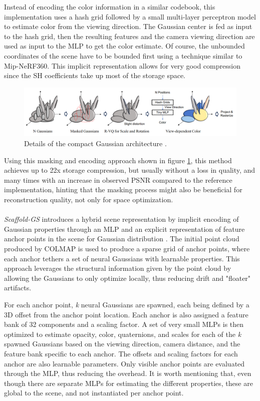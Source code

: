 Instead of encoding the color information in a similar codebook, this implementation uses a hash grid followed by a small multi-layer perceptron model to estimate color from the viewing direction. The Gaussian center is fed as input to the hash grid, then the resulting features and the camera viewing direction are used as input to the MLP to get the color estimate. Of course, the unbounded coordinates of the scene have to be bounded first using a technique similar to Mip-NeRF360. This implicit representation allows for very good compression since the SH coefficients take up most of the storage space.

\begin{figure}[H]
    \centering
    \includegraphics[width=0.7\linewidth]{figures/compact_arch.png}
    \caption{Details of the compact Gaussian architecture \cite{Lee_2024_CVPR}.}
    \label{fig:compact_arch}
\end{figure}

Using this masking and encoding approach shown in figure \ref{fig:compact_arch}, this method achieves up to 22x storage compression, but usually without a loss in quality, and many times with an increase in observed PSNR compared to the reference implementation, hinting that the masking process might also be beneficial for reconstruction quality, not only for space optimization.

\paragraph{}
\textit{Scaffold-GS} introduces a hybrid scene representation by implicit encoding of Gaussian properties through an MLP and an explicit representation of feature anchor points in the scene for Gaussian distribution \cite{scaffoldgs}. The initial point cloud produced by COLMAP is used to produce a sparse grid of anchor points, where each anchor tethers a set of neural Gaussians with learnable properties. This approach leverages the structural information given by the point cloud by allowing the Gaussians to only optimize locally, thus reducing drift and "floater" artifacts. 

For each anchor point, \textit{k} neural Gaussians are spawned, each being defined by a 3D offset from the anchor point location. Each anchor is also assigned a feature bank of 32 components and a scaling factor. A set of very small MLPs is then optimized to estimate opacity, color, quaternions, and scales for each of the \textit{k} spawned Gaussians based on the viewing direction, camera distance, and the feature bank specific to each anchor. The offsets and scaling factors for each anchor are also learnable parameters. Only visible anchor points are evaluated through the MLP, thus reducing the overhead. It is worth mentioning that, even though there are separate MLPs for estimating the different properties, these are global to the scene, and not instantiated per anchor point.

